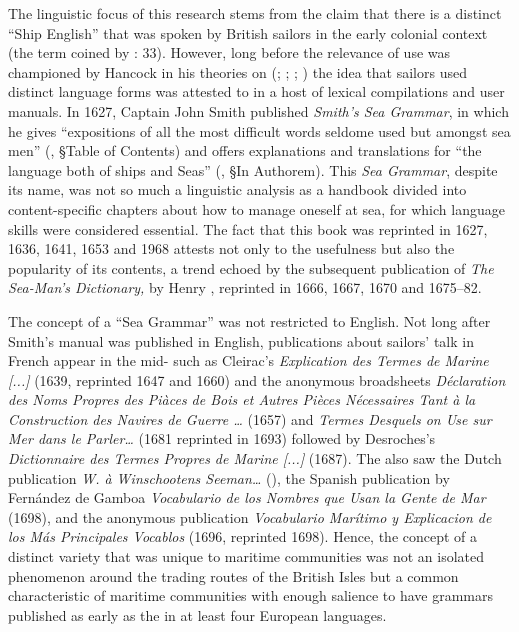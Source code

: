 The linguistic focus of this research stems from the claim that there is a distinct “Ship English” that was spoken by British sailors in the early colonial context (the term coined by \citealt{Hancock1976}: 33). However, long before the relevance of  use was championed by Hancock in his theories on  (\citealt{Hancock1972}; \citealt{Hancock1976}; \citealt{Hancock1986}; \citealt{Hancock1988}) the idea that sailors used distinct language forms was attested to in a host of lexical compilations and user manuals. In 1627, Captain John Smith published \textit{Smith’s Sea Grammar}, in which he gives “expositions of all the most difficult words seldome used but amongst sea men” (\citealt{Smith1627}, §Table of Contents) and offers explanations and translations for “the language both of ships and Seas” (\citealt{Smith1627}, §In Authorem). This \textit{Sea Grammar}, despite its name, was not so much a linguistic analysis as a handbook divided into content-specific chapters about how to manage oneself at sea, for which language skills were considered essential. The fact that this book was reprinted in 1627, 1636, 1641, 1653 and 1968 attests not only to the usefulness but also the popularity of its contents, a trend echoed by the subsequent publication of \textit{The Sea-Man’s Dictionary,} by Henry \citealt{Manwayring1644}, reprinted in 1666, 1667, 1670 and 1675–82. 



The concept of a “Sea Grammar” was not restricted to English. Not long after Smith’s manual was published in English, publications about sailors’ talk in French appear in the mid- such as Cleirac’s \textit{Explication des Termes de Marine [...]} (1639, reprinted 1647 and 1660) and the anonymous broadsheets \textit{Déclaration des Noms Propres des Piàces de Bois et Autres Pièces Nécessaires Tant à la Construction des Navires de Guerre …} (1657) and \textit{Termes Desquels on Use sur Mer dans le Parler…} (1681 reprinted in 1693) followed by Desroches’s \textit{Dictionnaire des Termes Propres de Marine [...]} (1687). The  also saw the Dutch publication \textit{W. à Winschootens Seeman…} (\citealt{Winschooten1681}), the Spanish publication by Fernández de Gamboa \textit{Vocabulario de los Nombres que Usan la Gente de Mar} (1698), and the anonymous publication \textit{Vocabulario Marítimo y Explicacion de los Más Principales Vocablos} (1696, reprinted 1698). Hence, the concept of a distinct variety that was unique to maritime communities was not an isolated phenomenon around the trading routes of the British Isles but a common characteristic of maritime communities with enough salience to have grammars published as early as the  in at least four European languages. 



